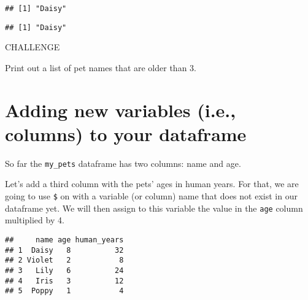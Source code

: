 \documentclass[]{book}
\newenvironment{Shaded}{\begin{snugshade}}{\end{snugshade}}
\newcommand{\CommentTok}[1]{\textcolor[rgb]{0.56,0.35,0.01}{\textit{#1}}}
\newcommand{\DecValTok}[1]{\textcolor[rgb]{0.00,0.00,0.81}{#1}}
\newcommand{\KeywordTok}[1]{\textcolor[rgb]{0.13,0.29,0.53}{\textbf{#1}}}
\newcommand{\NormalTok}[1]{#1}
\newcommand{\OperatorTok}[1]{\textcolor[rgb]{0.81,0.36,0.00}{\textbf{#1}}}
\newcommand{\StringTok}[1]{\textcolor[rgb]{0.31,0.60,0.02}{#1}}
\begin{document}
\begin{verbatim}
## [1] "Daisy"
\end{verbatim}

\begin{Shaded}
\end{Shaded}

\begin{verbatim}
## [1] "Daisy"
\end{verbatim}

\leavevmode\hypertarget{challenge}{}%
CHALLENGE

Print out a list of pet names that are older than 3.

\hypertarget{adding-new-variables-i.e.-columns-to-your-dataframe}{%
\section{Adding new variables (i.e., columns) to your dataframe}\label{adding-new-variables-i.e.-columns-to-your-dataframe}}

So far the \texttt{my\_pets} dataframe has two columns: name and age.

Let's add a third column with the pets' ages in human years. For that, we are going to use \texttt{\$} on with a variable (or column) name that does not exist in our dataframe yet. We will then assign to this variable the value in the \texttt{age} column multiplied by 4.

\begin{Shaded}
\end{Shaded}

\begin{verbatim}
##     name age human_years
## 1  Daisy   8          32
## 2 Violet   2           8
## 3   Lily   6          24
## 4   Iris   3          12
## 5  Poppy   1           4
\end{verbatim}
\end{document}
